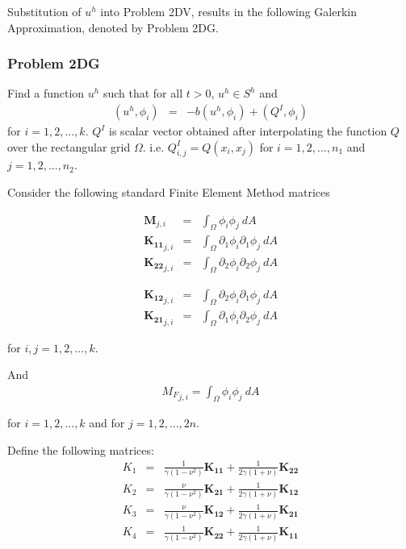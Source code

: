 Substitution of $u^h$ into Problem 2DV, results in the following Galerkin Approximation, denoted by Problem 2DG.

\subsubsection*{Problem 2DG}
Find a function $u^h$ such that for all $t>0$, $u^h \in S^h$ and
\begin{eqnarray*}
	(u^h, \phi_i) & = & -b(u^h,\phi_i) + (Q^I, \phi_i)
\end{eqnarray*} for $i = 1,2,...,k$. $Q^I$ is scalar vector obtained after interpolating the function $Q$ over the rectangular grid $\Omega$. i.e. $Q^I_{i,j} = Q(x_i,x_j)$ for $i = 1,2,...,n_1$ and $j = 1,2,...,n_2$.


Consider the following standard Finite Element Method matrices

\noindent\begin{minipage}{.5\linewidth}
	\begin{eqnarray*}
		\mathbf{M}_{j,i} & = & \int_{\Omega} \phi_i \phi_j ~dA \\
		\mathbf{{K}_{11}}_{j,i} & = & \int_{\Omega} \partial_1\phi_i \partial_1\phi_j~dA\\
		\mathbf{{K}_{22}}_{j,i} & = & \int_{\Omega} \partial_2\phi_i \partial_2\phi_j~dA
	\end{eqnarray*}
\end{minipage}%
\begin{minipage}{.5\linewidth}
	\begin{eqnarray*}
		\mathbf{{K}_{12}}_{j,i} & = & \int_{\Omega} \partial_2\phi_i \partial_1\phi_j~dA\\
		\mathbf{{K}_{21}}_{j,i} & = & \int_{\Omega} \partial_1\phi_i \partial_2\phi_j~dA
	\end{eqnarray*}
\end{minipage}
for $i,j = 1,2,...,k$.

And 
\begin{eqnarray*}
	{M_{F}}_{j,i} = \int_{\Omega}  \phi_i \phi_j~dA
\end{eqnarray*}

for $i = 1,2,...,k$ and for $j =1,2,...,2n$.

Define the following matrices:
\begin{eqnarray*}
	K_1 & = & \frac{1}{\gamma(1-\nu^2)} \mathbf{K_{11}} + \frac{1}{2\gamma(1+\nu)}\mathbf{K_{22}} \label{eq:2DFEM:K1} \\
	K_2 & = & \frac{\nu}{\gamma(1-\nu^2)} \mathbf{K_{21}} + \frac{1}{2\gamma(1+\nu)}\mathbf{K_{12}}\label{eq:2DFEM:K2}\\
	K_3 & = & \frac{\nu}{\gamma(1-\nu^2)} \mathbf{K_{12}} + \frac{1}{2\gamma(1+\nu)}\mathbf{K_{21}}\label{eq:2DFEM:K3}\\
	K_4 & = & \frac{1}{\gamma(1-\nu^2)} \mathbf{K_{22}} + \frac{1}{2\gamma(1+\nu)}\mathbf{K_{11}}\label{eq:2DFEM:K4}
\end{eqnarray*}

